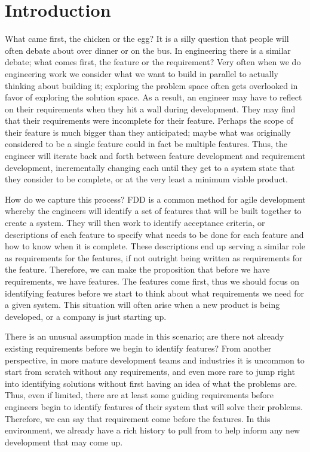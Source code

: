 \chapter{Introduction}

What came first, the chicken or the egg? It is a silly question that people will often debate about over dinner or on the bus. In engineering there is a similar debate; what comes first, the feature or the requirement? Very often when we do engineering work we consider what we want to build in parallel to actually thinking about building it; exploring the problem space often gets overlooked in favor of exploring the solution space. As a result, an engineer may have to reflect on their requirements when they hit a wall during development. They may find that their requirements were incomplete for their feature. Perhaps the scope of their feature is much bigger than they anticipated; maybe what was originally considered to be a single feature could in fact be multiple features. Thus, the engineer will iterate back and forth between feature development and requirement development, incrementally changing each until they get to a system state that they consider to be complete, or at the very least a minimum viable product. 

How do we capture this process? \ac{FDD} is a common method for agile development whereby the engineers will identify a set of features that will be built together to create a system. They will then work to identify acceptance criteria, or descriptions of each feature to specify what needs to be done for each feature and how to know when it is complete. These descriptions end up serving a similar role as requirements for the features, if not outright being written as requirements for the feature. Therefore, we can make the proposition that before we have requirements, we have features. The features come first, thus we should focus on identifying features before we start to think about what requirements we need for a given system. This situation will often arise when a new product is being developed, or a company is just starting up.

There is an unusual assumption made in this scenario; are there not already existing requirements before we begin to identify features? From another perspective, in more mature development teams and industries it is uncommon to start from scratch without any requirements, and even more rare to jump right into identifying solutions without first having an idea of what the problems are. Thus, even if limited, there are at least some guiding requirements before engineers begin to identify features of their system that will solve their problems. Therefore, we can say that requirement come before the features. In this environment, we already have a rich history to pull from to help inform any new development that may come up.

